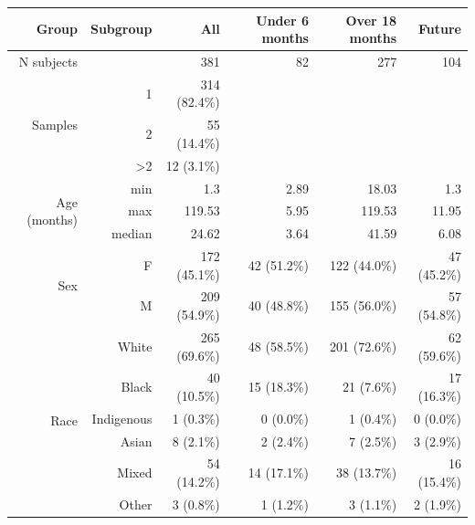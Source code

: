 \documentclass{article}
\begin{document}
\begin{table}[!h]
    \centering
    \begin{tabular}{|r|r|r|r|r|r|}
      \hline\hline
      \textbf{Group}              & \textbf{Subgroup}        & \textbf{All} & \textbf{Under 6 months} & \textbf{Over 18 months} & \textbf{Future} \\\hline
      N subjects                  &                          & 381 & 82 & 277 & 104 \\  \hline
    \multirow{3}{*}{Samples}      & 1                        & 314 (82.4\%) &  &  &  \\ \cline{2-6}
                                  & 2                        & 55 (14.4\%) &  &  &  \\ \cline{2-6}
                                  & \textgreater 2           & 12 (3.1\%) &  &  &  \\ \hline
    \multirow{3}{*}{Age (months)} & min                      & 1.3 & 2.89 & 18.03 & 1.3 \\ \cline{2-6}
                                  & max                      & 119.53 & 5.95 & 119.53 & 11.95 \\ \cline{2-6}
                                  & median                   & 24.62 & 3.64 & 41.59 & 6.08 \\ \hline
    \multirow{2}{*}{Sex}          & F                        & 172 (45.1\%) & 42 (51.2\%) & 122 (44.0\%) & 47 (45.2\%) \\   \cline{2-6}
                                  & M                        & 209 (54.9\%) & 40 (48.8\%) & 155 (56.0\%) & 57 (54.8\%) \\  \hline
    \multirow{6}{*}{Race}         & White                    & 265 (69.6\%) & 48 (58.5\%) & 201 (72.6\%) & 62 (59.6\%) \\   \cline{2-6}
                                  & Black                    & 40 (10.5\%) & 15 (18.3\%) & 21 (7.6\%) & 17 (16.3\%) \\ \cline{2-6}
                                  & Indigenous               & 1 (0.3\%) & 0 (0.0\%) & 1 (0.4\%) & 0 (0.0\%) \\ \cline{2-6}
                                  & Asian                    & 8 (2.1\%) & 2 (2.4\%) & 7 (2.5\%) & 3 (2.9\%) \\ \cline{2-6}
                                  & Mixed                    & 54 (14.2\%) & 14 (17.1\%) & 38 (13.7\%) & 16 (15.4\%) \\ \cline{2-6}
                                  & Other                    & 3 (0.8\%) & 1 (1.2\%) & 3 (1.1\%) & 2 (1.9\%) \\ \hline

\end{tabular}
\end{table}
\end{document}

